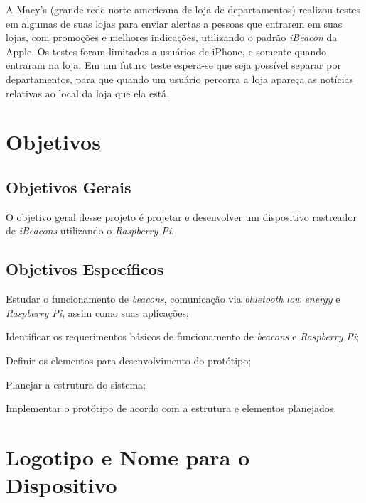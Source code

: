 A Macy's (grande rede norte americana de loja de departamentos) realizou testes em algumas de suas lojas para enviar alertas a pessoas que entrarem em suas lojas, com promoções e melhores indicações, utilizando o padrão \textit{iBeacon} da Apple. Os testes foram limitados a usuários de iPhone, e somente quando entraram na loja. Em um futuro teste espera-se que seja possível separar por departamentos, para que quando um usuário percorra a loja apareça as notícias relativas ao local da loja que ela está. \cite{kastrenakes-macys-beacon}


\section{Objetivos}\label{cap:objetivos-justificativa}

\subsection{Objetivos Gerais}\label{sec:objetivos-gerais}

O objetivo geral desse projeto é projetar e desenvolver um dispositivo rastreador de \textit{iBeacons} utilizando o \textit{Raspberry Pi}.


\subsection{Objetivos Específicos}\label{sec:objetivos-especificos}

\begin{alineas}
	\item Estudar o funcionamento de \textit{beacons}, comunicação via \textit{bluetooth low energy} e \textit{Raspberry Pi}, assim como suas aplicações;
	\item Identificar os requerimentos básicos de funcionamento de \textit{beacons} e \textit{Raspberry Pi};
	\item Definir os elementos para desenvolvimento do protótipo;
	\item Planejar a estrutura do sistema;
	\item Implementar o protótipo de acordo com a estrutura e elementos planejados.
\end{alineas}



\section{Logotipo e Nome para o Dispositivo}\label{sec:logotipo-prototipo}

